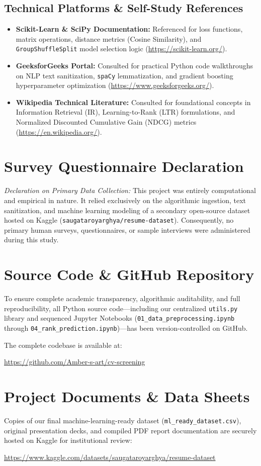 \documentclass[12pt,a4paper,oneside]{report}
\begin{document}
\subsection*{Technical Platforms \& Self-Study References}
\begin{itemize}
    \item \textbf{Scikit-Learn \& SciPy Documentation:} Referenced for loss functions, matrix operations, distance metrics (Cosine Similarity), and \texttt{GroupShuffleSplit} model selection logic (\url{https://scikit-learn.org/}).
    
    \item \textbf{GeeksforGeeks Portal:} Consulted for practical Python code walkthroughs on NLP text sanitization, \texttt{spaCy} lemmatization, and gradient boosting hyperparameter optimization (\url{https://www.geeksforgeeks.org/}).
    
    \item \textbf{Wikipedia Technical Literature:} Consulted for foundational concepts in Information Retrieval (IR), Learning-to-Rank (LTR) formulations, and Normalized Discounted Cumulative Gain ($\text{NDCG}$) metrics (\url{https://en.wikipedia.org/}).
\end{itemize}

\section{Survey Questionnaire Declaration}
\textit{Declaration on Primary Data Collection:} This project was entirely computational and empirical in nature. It relied exclusively on the algorithmic ingestion, text sanitization, and machine learning modeling of a secondary open-source dataset hosted on Kaggle (\texttt{saugataroyarghya/resume-dataset}). Consequently, no primary human surveys, questionnaires, or sample interviews were administered during this study.

\section{Source Code \& GitHub Repository}
To ensure complete academic transparency, algorithmic auditability, and full reproducibility, all Python source code—including our centralized \texttt{utils.py} library and sequenced Jupyter Notebooks (\texttt{01\_data\_preprocessing.ipynb} through \texttt{04\_rank\_prediction.ipynb})—has been version-controlled on GitHub.

The complete codebase is available at:
\begin{center}
    \url{https://github.com/Amber-s-art/cv-screening}
\end{center}

\section{Project Documents \& Data Sheets}
Copies of our final machine-learning-ready dataset (\texttt{ml\_ready\_dataset.csv}), original presentation decks, and compiled PDF report documentation are securely hosted on Kaggle for institutional review:
\begin{center}
    \url{https://www.kaggle.com/datasets/saugataroyarghya/resume-dataset}
\end{center}
\end{document}

